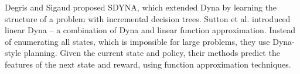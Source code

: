 


Degris and Sigaud \cite{ApproxTree} proposed SDYNA, which extended Dyna \cite{Dyna} by
learning the structure of a problem with incremental decision trees.
Sutton et al. \cite{ApproxDyna} introduced linear Dyna -- a combination 
of Dyna and linear function approximation. 
Instead of enumerating all states, which is impossible for large problems, they
use Dyna-style planning. Given the current state and policy, 
their methods predict the features of the next state and reward, using function approximation
techniques. 


